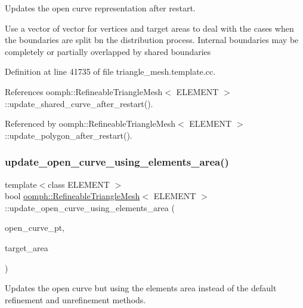 Updates the open curve representation after restart. 

Use a vector of vector for vertices and target areas to deal with the cases when the boundaries are split bn the distribution process. Internal boundaries may be completely or partially overlapped by shared boundaries 

Definition at line 41735 of file triangle\+\_\+mesh.\+template.\+cc.



References oomph\+::\+Refineable\+Triangle\+Mesh$<$ E\+L\+E\+M\+E\+N\+T $>$\+::update\+\_\+shared\+\_\+curve\+\_\+after\+\_\+restart().



Referenced by oomph\+::\+Refineable\+Triangle\+Mesh$<$ E\+L\+E\+M\+E\+N\+T $>$\+::update\+\_\+polygon\+\_\+after\+\_\+restart().

\mbox{\label{classoomph_1_1RefineableTriangleMesh_a75a9af063616474dc96e951b5a3025b9}} 
\subsubsection{\texorpdfstring{update\+\_\+open\+\_\+curve\+\_\+using\+\_\+elements\+\_\+area()}{update\_open\_curve\_using\_elements\_area()}}
{\footnotesize\ttfamily template$<$class E\+L\+E\+M\+E\+NT $>$ \\
bool \hyperlink{classoomph_1_1RefineableTriangleMesh}{oomph\+::\+Refineable\+Triangle\+Mesh}$<$ E\+L\+E\+M\+E\+NT $>$\+::update\+\_\+open\+\_\+curve\+\_\+using\+\_\+elements\+\_\+area (\begin{DoxyParamCaption}\item[{Triangle\+Mesh\+Open\+Curve $\ast$\&}]{open\+\_\+curve\+\_\+pt,  }\item[{const Vector$<$ double $>$ \&}]{target\+\_\+area }\end{DoxyParamCaption})\hspace{0.3cm}{\ttfamily [protected]}}



Updates the open curve but using the elements area instead of the default refinement and unrefinement methods. 

